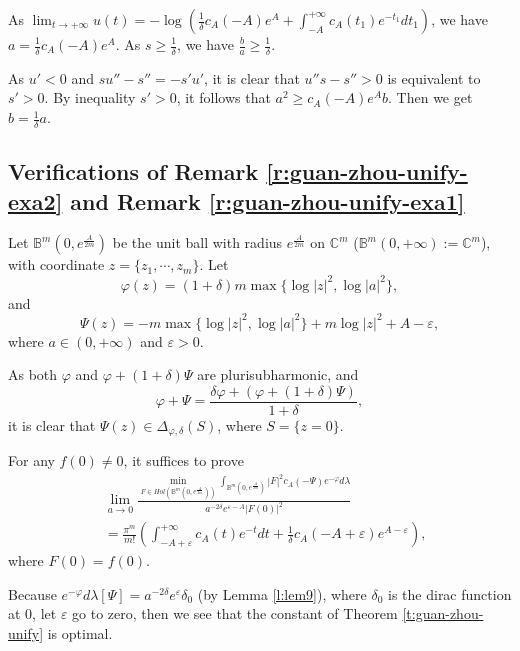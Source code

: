 As
$\lim_{t\to+\infty}u(t)=-\log(\frac{1}{\delta}c_{A}(-A)e^{A}+\int_{-A}^{+\infty}c_{A}(t_{1})e^{-t_{1}}dt_{1})$,
we have $a=\frac{1}{\delta}c_{A}(-A)e^{A}$. As
$s\geq\frac{1}{\delta}$, we have $\frac{b}{a}\geq\frac{1}{\delta}$.

As $u'<0$ and $su''-s''=-s'u'$, it is clear that $u''s-s''>0$ is
equivalent to $s'>0$. By inequality $s'>0$, it follows that
$a^{2}\geq c_{A}(-A)e^{A}b$. Then we get $b=\frac{1}{\delta}a$.


\subsection{Verifications of Remark \ref{r:guan-zhou-unify-exa2} and Remark \ref{r:guan-zhou-unify-exa1}}

Let $\mathbb{B}^{m}(0,{e^{\frac{A}{2m}}})$ be the unit ball with
radius $e^{\frac{A}{2m}}$ on $\mathbb{C}^{m}$
($\mathbb{B}^{m}(0,+\infty):=\mathbb{C}^{m}$), with coordinate
$z=\{z_{1},\cdots,z_{m}\}$. Let
$$\varphi(z)=(1+\delta)m\max\{\log|z|^{2},\log|a|^{2}\},$$ and
$$\Psi(z)=-m\max\{\log|z|^{2},\log|a|^{2}\}+m\log|z|^{2}+A-\varepsilon,$$
where $a\in(0,+\infty)$ and $\varepsilon>0$.

As both $\varphi$ and $\varphi+(1+\delta)\Psi$ are plurisubharmonic,
and
$$\varphi+\Psi=\frac{\delta\varphi+(\varphi+(1+\delta)\Psi)}{1+\delta},$$ it is clear that
$\Psi(z)\in \Delta_{\varphi,\delta}(S)$, where $S=\{z=0\}$.

For any $f(0)\neq 0$, it suffices to prove
\begin{equation}
\label{equ:opt1}
\begin{split}
&\lim_{a\to 0}\frac{\min_{F\in Hol(\mathbb{B}^{m}(0,{e^{\frac{A}{2m}}}))}
\int_{\mathbb{B}^{m}(0,{e^{\frac{A}{2m}}})} |F|^{2}c_{A}
(-\Psi)e^{-\varphi}d\lambda}{a^{-2\delta}e^{\varepsilon-A}|F(0)|^{2} }
\\&=\frac{\pi^{m}}{m!}(\int_{-A+\varepsilon}^{+\infty}c_{A}(t)e^{-t}dt+
\frac{1}{\delta}c_{A}(-A+\varepsilon)e^{A-\varepsilon}),
\end{split}
\end{equation}
where $F(0)=f(0)$.

Because
$e^{-\varphi}d\lambda[\Psi]=a^{-2\delta}e^{\varepsilon}\delta_{0}$
(by Lemma \ref{l:lem9}), where $\delta_{0}$ is the dirac function at
$0$, let $\varepsilon$ go to zero, then we see that the constant of
Theorem \ref{t:guan-zhou-unify} is optimal.

